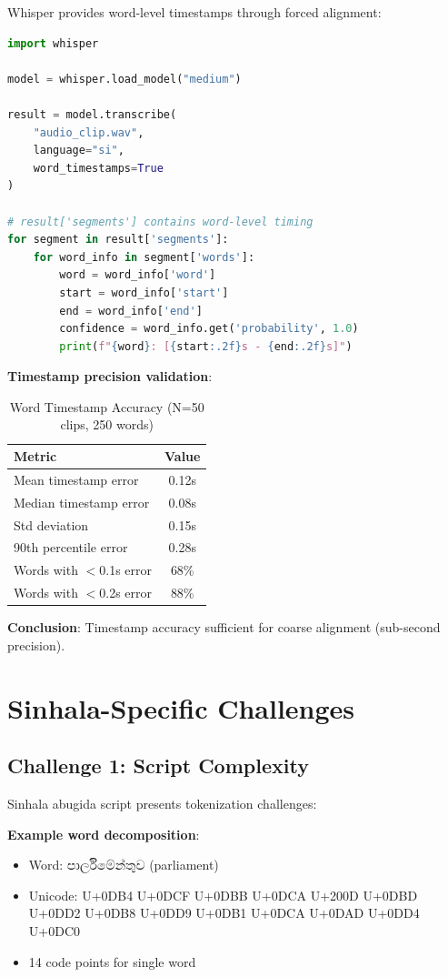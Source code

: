 \documentclass[11pt,a4paper]{article}
\begin{document}
Whisper provides word-level timestamps through forced alignment:

\begin{lstlisting}[language=Python]
import whisper

model = whisper.load_model("medium")

result = model.transcribe(
    "audio_clip.wav",
    language="si",
    word_timestamps=True
)

# result['segments'] contains word-level timing
for segment in result['segments']:
    for word_info in segment['words']:
        word = word_info['word']
        start = word_info['start']
        end = word_info['end']
        confidence = word_info.get('probability', 1.0)
        print(f"{word}: [{start:.2f}s - {end:.2f}s]")
\end{lstlisting}

\textbf{Timestamp precision validation}:

\begin{table}[htbp]
\centering
\caption{Word Timestamp Accuracy (N=50 clips, 250 words)}
\begin{tabular}{@{}lc@{}}
\toprule
\textbf{Metric} & \textbf{Value} \\ \midrule
Mean timestamp error & 0.12s \\
Median timestamp error & 0.08s \\
Std deviation & 0.15s \\
90th percentile error & 0.28s \\
Words with $<$0.1s error & 68\% \\
Words with $<$0.2s error & 88\% \\
\bottomrule
\end{tabular}
\end{table}

\textbf{Conclusion}: Timestamp accuracy sufficient for coarse alignment (sub-second precision).

\section{Sinhala-Specific Challenges}

\subsection{Challenge 1: Script Complexity}

Sinhala abugida script presents tokenization challenges:

\textbf{Example word decomposition}:
\begin{itemize}
    \item Word: පාර්ලිමේන්තුව (parliament)
    \item Unicode: U+0DB4 U+0DCF U+0DBB U+0DCA U+200D U+0DBD U+0DD2 U+0DB8 U+0DD9 U+0DB1 U+0DCA U+0DAD U+0DD4 U+0DC0
    \item 14 code points for single word
\end{itemize}
\end{document}
